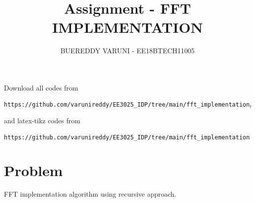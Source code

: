 \documentclass[journal,12pt,twocolumn]{IEEEtran}
\begin{document}
     \def\rightbox#1{\makebox[0in][r]{#1}}
     \def\centbox#1{\makebox[0in]{#1}}
     \def\topbox#1{\raisebox{-\baselineskip}[0in][0in]{#1}}
     \def\midbox#1{\raisebox{-0.5\baselineskip}[0in][0in]{#1}}
\vspace{3cm}
\title{Assignment - FFT IMPLEMENTATION}
\author{BUEREDDY VARUNI - EE18BTECH11005}
\maketitle
\newpage
\bigskip
\renewcommand{\thefigure}{\theenumi}
\renewcommand{\thetable}{\theenumi}
Download all codes from 
\begin{lstlisting}
https://github.com/varunireddy/EE3025_IDP/tree/main/fft_implementation/codes
\end{lstlisting}
%
and latex-tikz codes from 
%
\begin{lstlisting}
https://github.com/varunireddy/EE3025_IDP/tree/main/fft_implementation
\end{lstlisting}
\section{Problem}
FFT implementation algorithm using recursive approach.
\end{document}
